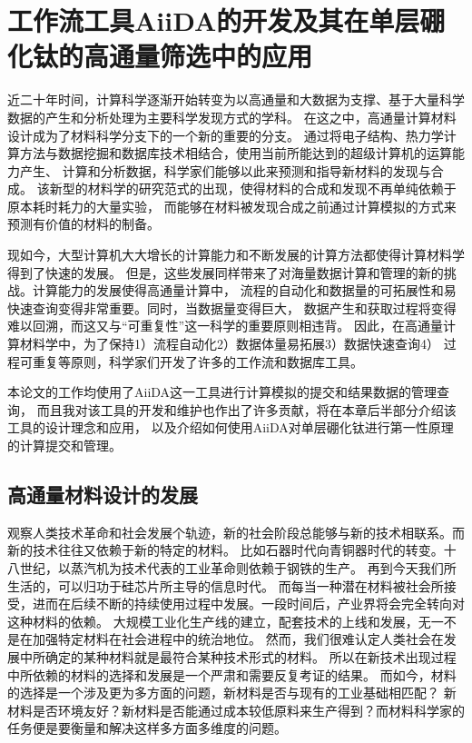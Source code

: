 \chapter{工作流工具AiiDA的开发及其在单层硼化钛的高通量筛选中的应用}\label{chapter:workflows}

近二十年时间，计算科学逐渐开始转变为以高通量和大数据为支撑、基于大量科学数据的产生和分析处理为主要科学发现方式的学科。
在这之中，高通量计算材料设计成为了材料科学分支下的一个新的重要的分支。
通过将电子结构、热力学计算方法与数据挖掘和数据库技术相结合，使用当前所能达到的超级计算机的运算能力产生、
计算和分析数据，科学家们能够以此来预测和指导新材料的发现与合成。
该新型的材料学的研究范式的出现，使得材料的合成和发现不再单纯依赖于原本耗时耗力的大量实验，
而能够在材料被发现合成之前通过计算模拟的方式来预测有价值的材料的制备。

现如今，大型计算机大大增长的计算能力和不断发展的计算方法都使得计算材料学得到了快速的发展。
但是，这些发展同样带来了对海量数据计算和管理的新的挑战。计算能力的发展使得高通量计算中，
流程的自动化和数据量的可拓展性和易快速查询变得非常重要。同时，当数据量变得巨大，
数据产生和获取过程将变得难以回溯，而这又与“可重复性”这一科学的重要原则相违背。
因此，在高通量计算材料学中，为了保持1）流程自动化2）数据体量易拓展3）数据快速查询4）
过程可重复等原则，科学家们开发了许多的工作流和数据库工具。

本论文的工作均使用了AiiDA\cite{pizzi2016aiida,huber2020aiida}这一工具进行计算模拟的提交和结果数据的管理查询，
而且我对该工具的开发和维护也作出了许多贡献，将在本章后半部分介绍该工具的设计理念和应用，
以及介绍如何使用AiiDA对单层硼化钛进行第一性原理的计算提交和管理。

\section{高通量材料设计的发展}
观察人类技术革命和社会发展个轨迹，新的社会阶段总能够与新的技术相联系。而新的技术往往又依赖于新的特定的材料。
比如石器时代向青铜器时代的转变。十八世纪，以蒸汽机为技术代表的工业革命则依赖于钢铁的生产。
再到今天我们所生活的，可以归功于硅芯片所主导的信息时代。
而每当一种潜在材料被社会所接受，进而在后续不断的持续使用过程中发展。一段时间后，产业界将会完全转向对这种材料的依赖。
大规模工业化生产线的建立，配套技术的上线和发展，无一不是在加强特定材料在社会进程中的统治地位。
然而，我们很难认定人类社会在发展中所确定的某种材料就是最符合某种技术形式的材料。
所以在新技术出现过程中所依赖的材料的选择和发展是一个严肃和需要反复考证的结果。
而如今，材料的选择是一个涉及更为多方面的问题，新材料是否与现有的工业基础相匹配？
新材料是否环境友好？新材料是否能通过成本较低原料来生产得到？而材料科学家的任务便是要衡量和解决这样多方面多维度的问题。

